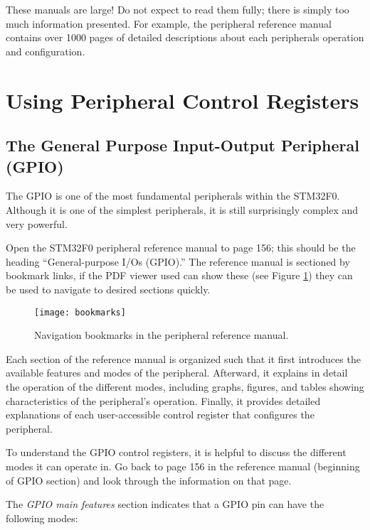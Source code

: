 \documentclass[11pt,fleqn]{book} %
\begin{document}
\begin{warning}
    These manuals are large! Do not expect to read them fully; there is simply too much information presented. For example, the peripheral reference manual contains over 1000 pages of detailed descriptions about each peripherals operation and configuration.
\end{warning}

\section{Using Peripheral Control Registers}

\subsection{The General Purpose Input-Output Peripheral (GPIO)}

The GPIO is one of the most fundamental peripherals within the STM32F0. Although it is one of the simplest peripherals, it is still surprisingly complex and very powerful.

Open the STM32F0 peripheral reference manual to page 156; this should be the heading ``General-purpose I/Os (GPIO).'' The reference manual is sectioned by bookmark links, if the PDF viewer used can show these (see Figure \ref{bookmarks}) they can be used to navigate to desired sections quickly.

\begin{figure}[]
    \centering\texttt{[image: bookmarks]}
    \caption{Navigation bookmarks in the peripheral reference manual.}
    \label{bookmarks}
\end{figure}

Each section of the reference manual is organized such that it first introduces the available features and modes of the peripheral. Afterward, it explains in detail the operation of the different modes,  including graphs, figures, and tables showing characteristics of the peripheral's operation. Finally, it provides detailed explanations of each user-accessible control register that configures the peripheral.

To understand the GPIO control registers, it is helpful to discuss the different modes it can operate in. Go back to page 156 in the reference manual (beginning of GPIO section) and look through the information on that page.

The \textit{GPIO main features} section indicates that a GPIO pin can have the following modes:
\end{document}
